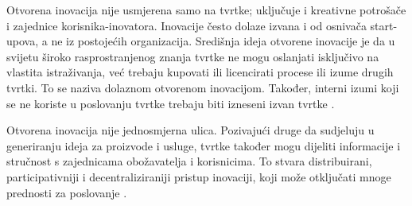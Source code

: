 Otvorena inovacija nije usmjerena samo na tvrtke; uključuje i kreativne
potrošače i zajednice korisnika-inovatora. Inovacije često dolaze izvana i od
osnivača start-upova, a ne iz postojećih organizacija. Središnja ideja otvorene
inovacije je da u svijetu široko rasprostranjenog znanja tvrtke ne mogu
oslanjati isključivo na vlastita istraživanja, već trebaju kupovati ili
licencirati procese ili izume drugih tvrtki. To se naziva dolaznom otvorenom
inovacijom. Također, interni izumi koji se ne koriste u poslovanju tvrtke
trebaju biti izneseni izvan tvrtke \citep{wikipediaopeninnovation2021}.

Otvorena inovacija nije jednosmjerna ulica. Pozivajući druge da sudjeluju u
generiranju ideja za proizvode i usluge, tvrtke također mogu dijeliti
informacije i stručnost s zajednicama obožavatelja i korisnicima. To stvara
distribuirani, participativniji i decentraliziraniji pristup inovaciji, koji
može otključati mnoge prednosti za poslovanje
\citep{braineetopeninnovation2023}.